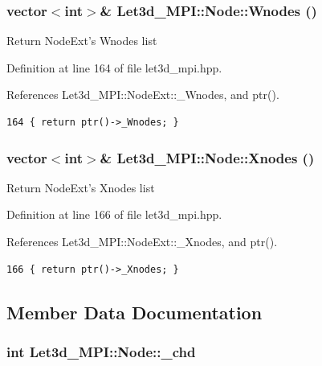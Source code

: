 \subsubsection{\setlength{\rightskip}{0pt plus 5cm}vector$<$int$>$\& Let3d\_\-MPI::Node::Wnodes ()\hspace{0.3cm}{\tt  [inline]}}\label{classLet3d__MPI_1_1Node_eff61124e41de07b2a437c02712734f5_eff61124e41de07b2a437c02712734f5}


Return Node\-Ext's Wnodes list 

Definition at line 164 of file let3d\_\-mpi.hpp.

References Let3d\_\-MPI::Node\-Ext::\_\-Wnodes, and ptr().

\footnotesize\begin{verbatim}164 { return ptr()->_Wnodes; }
\end{verbatim}\normalsize 


\subsubsection{\setlength{\rightskip}{0pt plus 5cm}vector$<$int$>$\& Let3d\_\-MPI::Node::Xnodes ()\hspace{0.3cm}{\tt  [inline]}}\label{classLet3d__MPI_1_1Node_1cfb3db72d5926015481da96073fbe27_1cfb3db72d5926015481da96073fbe27}


Return Node\-Ext's Xnodes list 

Definition at line 166 of file let3d\_\-mpi.hpp.

References Let3d\_\-MPI::Node\-Ext::\_\-Xnodes, and ptr().

\footnotesize\begin{verbatim}166 { return ptr()->_Xnodes; }
\end{verbatim}\normalsize 




\subsection{Member Data Documentation}
\subsubsection{\setlength{\rightskip}{0pt plus 5cm}int {\bf Let3d\_\-MPI::Node::\_\-chd}\hspace{0.3cm}{\tt  [protected]}}\label{classLet3d__MPI_1_1Node_3d7f0cc89372f787ca1a9a8bfc4c80ac_3d7f0cc89372f787ca1a9a8bfc4c80ac}


